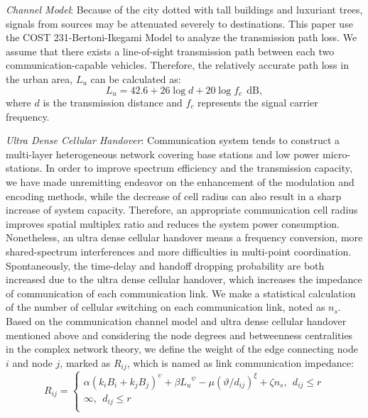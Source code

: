 \documentclass[journal,12pt,draftclsnofoot,onecolumn]{IEEEtran}
\begin{document}
\emph{Channel Model}: Because of the city dotted with tall buildings and luxuriant trees, signals from sources may be attenuated severely to destinations. This paper use the COST 231-Bertoni-Ikegami Model to analyze the transmission path loss. We assume that there exists a line-of-sight transmission path between each two communication-capable vehicles. Therefore, the relatively accurate path loss in the urban area, $L_{u}$ can be calculated as:
\begin{equation}\label{2}
{{L}_{u}}=42.6+26\log d+20\log {{f}_{c}}~~\mathrm{dB},
\end{equation}
where $d$ is the transmission distance and $f_{c}$ represents the signal carrier frequency.


\emph{Ultra Dense Cellular Handover}: Communication system tends to construct a multi-layer heterogeneous network covering base stations and low power micro-stations. In order to improve spectrum efficiency and the transmission capacity, we have made unremitting endeavor on the enhancement of the modulation and encoding methods, while the decrease of cell radius can also result in a sharp increase of system capacity. Therefore, an appropriate communication cell radius improves spatial multiplex ratio and reduces the system power consumption.
Nonetheless, an ultra dense cellular handover means a frequency conversion, more shared-spectrum interferences and more difficulties in multi-point coordination. Spontaneously, the time-delay and handoff dropping probability are both increased due to the ultra dense cellular handover, which increases the impedance of communication of each communication link. We make a statistical calculation of the number of cellular switching on each communication link, noted as $n_{s}$.
Based on the communication channel model and ultra dense cellular handover mentioned above and considering the node degrees and betweenness centralities in the complex network theory, we define the weight of the edge connecting node $i$ and node $j$, marked as $R_{ij}$, which is named as link communication impedance:
\begin{equation}\label{15}
{{R}_{ij}}\!=\!\left\{ \begin{matrix}
   \alpha {{({{k}_{i}}{{B}_{i}}\!+\!{{k}_{j}{{B}_{j}}})}^{\upsilon}}\!+\!\beta {{{{{L}_{u}}}}^{\psi }}\!-\!\mu {{(\vartheta/d_{ij})}^{\xi }}+\zeta{n_{s}} ,~~d_{ij}\leq r  \\
   \infty ,~~ d_{ij}\leq r \\
\end{matrix} \right.
\end{equation}
\end{document}
